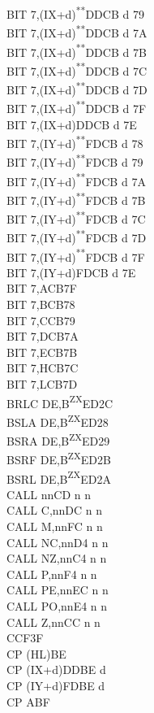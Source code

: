 \documentclass[twoside,openright,a4paper]{book}
\newcommand{\UNDOC}{\textnormal{\textsuperscript{**}}}
\newcommand{\ZXN}{\textnormal{\textsuperscript{ZX}}}
\begin{document}
\begin{multicols}{3}
{\begin{tabbing}
	BIT 7,(IX+d)\UNDOC\>DDCB d 79\\
	BIT 7,(IX+d)\UNDOC\>DDCB d 7A\\
	BIT 7,(IX+d)\UNDOC\>DDCB d 7B\\
	BIT 7,(IX+d)\UNDOC\>DDCB d 7C\\
	BIT 7,(IX+d)\UNDOC\>DDCB d 7D\\
	BIT 7,(IX+d)\UNDOC\>DDCB d 7F\\
	BIT 7,(IX+d)\>DDCB d 7E\\
	BIT 7,(IY+d)\UNDOC\>FDCB d 78\\
	BIT 7,(IY+d)\UNDOC\>FDCB d 79\\
	BIT 7,(IY+d)\UNDOC\>FDCB d 7A\\
	BIT 7,(IY+d)\UNDOC\>FDCB d 7B\\
	BIT 7,(IY+d)\UNDOC\>FDCB d 7C\\
	BIT 7,(IY+d)\UNDOC\>FDCB d 7D\\
	BIT 7,(IY+d)\UNDOC\>FDCB d 7F\\
	BIT 7,(IY+d)\>FDCB d 7E\\
	BIT 7,A\>CB7F\\
	BIT 7,B\>CB78\\
	BIT 7,C\>CB79\\
	BIT 7,D\>CB7A\\
	BIT 7,E\>CB7B\\
	BIT 7,H\>CB7C\\
	BIT 7,L\>CB7D\\
	BRLC DE,B\ZXN\>ED2C\\
	BSLA DE,B\ZXN\>ED28\\
	BSRA DE,B\ZXN\>ED29\\
	BSRF DE,B\ZXN\>ED2B\\
	BSRL DE,B\ZXN\>ED2A\\
	CALL nn\>CD n n\\
	CALL C,nn\>DC n n\\
	CALL M,nn\>FC n n\\
	CALL NC,nn\>D4 n n\\
	CALL NZ,nn\>C4 n n\\
	CALL P,nn\>F4 n n\\
	CALL PE,nn\>EC n n\\
	CALL PO,nn\>E4 n n\\
	CALL Z,nn\>CC n n\\
	CCF\>3F\\
	CP (HL)\>BE\\
	CP (IX+d)\>DDBE d\\
	CP (IY+d)\>FDBE d\\
	CP A\>BF\\

\end{tabbing}}
\end{multicols}
\end{document}
